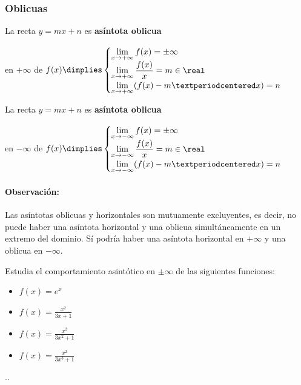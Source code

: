 \subsubsection{Oblicuas}

\begin{defn}

La recta $y=mx+n$ es \textbf{asíntota oblicua}

en $+\infty$ de $f(x)\dimplies \displaystyle
\begin{cases}
	\displaystyle\lim_{x\to +\infty}f(x) = \pm\infty\\
 	\displaystyle\lim_{x\to +\infty}\frac{f(x)}{x} = m\in\real\\
 	\displaystyle\lim_{x\to +\infty}(f(x) - m·x) = n
 \end{cases}$

La recta $y=mx+n$ es \textbf{asíntota oblicua} 

en $-\infty$ de $f(x)\dimplies \displaystyle
\begin{cases}
	\displaystyle\lim_{x\to -\infty}f(x) = \pm\infty\\
 	\displaystyle\lim_{x\to -\infty}\frac{f(x)}{x} = m\in\real\\
 	\displaystyle\lim_{x\to -\infty}(f(x) - m·x) = n
 \end{cases}$
\end{defn}

\paragraph{Observación:} Las asíntotas oblicuas y horizontales son mutuamente excluyentes, es decir, no puede haber una asíntota horizontal y una oblicua simultáneamente en un extremo del dominio. Sí podría haber una asíntota horizontal en $+\infty$ y una oblicua en $-\infty$.

\begin{problem}
Estudia el comportamiento asintótico en $\pm\infty$ de las siguientes funciones:
\begin{itemize}
	\item $f(x) = e^x$
	\item $f(x) = \frac{x^2}{3x+1}$
	\item $f(x) = \frac{x^2}{3x^2+1}$
	\item $f(x) = \frac{x^2}{3x^3+1}$
\end{itemize}

\solution

.\vspace{10cm}.

\end{problem}

